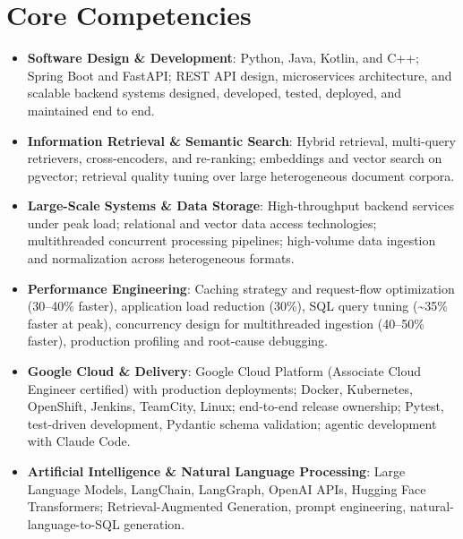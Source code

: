 \documentclass[11pt,a4paper,sans]{moderncv}
\begin{document}
\section{Core Competencies}
\vspace{1pt}
\begin{itemize}

\item \textbf{Software Design \& Development}: Python, Java, Kotlin, and C++; Spring Boot and FastAPI; REST API design, microservices architecture, and scalable backend systems designed, developed, tested, deployed, and maintained end to end.

\item \textbf{Information Retrieval \& Semantic Search}: Hybrid retrieval, multi-query retrievers, cross-encoders, and re-ranking; embeddings and vector search on pgvector; retrieval quality tuning over large heterogeneous document corpora.

\item \textbf{Large-Scale Systems \& Data Storage}: High-throughput backend services under peak load; relational and vector data access technologies; multithreaded concurrent processing pipelines; high-volume data ingestion and normalization across heterogeneous formats.

\item \textbf{Performance Engineering}: Caching strategy and request-flow optimization (30--40\% faster), application load reduction (30\%), SQL query tuning (\textasciitilde35\% faster at peak), concurrency design for multithreaded ingestion (40--50\% faster), production profiling and root-cause debugging.

\item \textbf{Google Cloud \& Delivery}: Google Cloud Platform (Associate Cloud Engineer certified) with production deployments; Docker, Kubernetes, OpenShift, Jenkins, TeamCity, Linux; end-to-end release ownership; Pytest, test-driven development, Pydantic schema validation; agentic development with Claude Code.

\item \textbf{Artificial Intelligence \& Natural Language Processing}: Large Language Models, LangChain, LangGraph, OpenAI APIs, Hugging Face Transformers; Retrieval-Augmented Generation, prompt engineering, natural-language-to-SQL generation.

\end{itemize}

\end{document}
